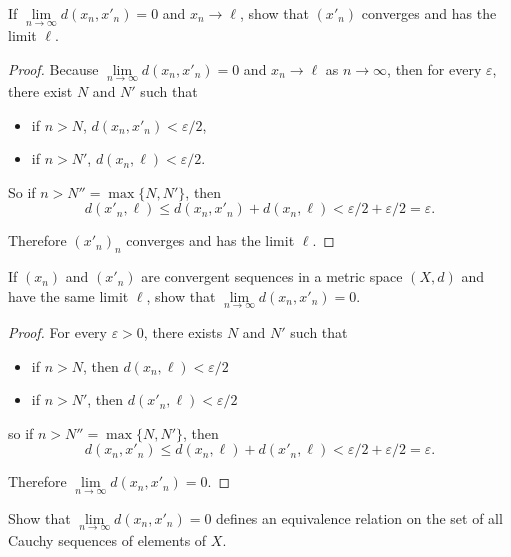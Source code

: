 \begin{exercise}\label{chapter1:section6:exercise9}
    If $\lim\limits_{n\to\infty} d(x_{n}, x'_{n}) = 0$ and $x_{n}\to \ell$, show that ${(x'_{n})}$ converges and has the limit $\ell$.
\end{exercise}

\begin{proof}
    Because $\lim\limits_{n\to\infty} d(x_{n}, x'_{n}) = 0$ and $x_{n}\to \ell$ as $n\to \infty$, then for every $\varepsilon$, there exist $N$ and $N'$ such that
    \begin{itemize}
        \item if $n > N$, $d(x_{n}, x'_{n}) < \varepsilon/2$,
        \item if $n > N'$, $d(x_{n}, \ell) < \varepsilon/2$.
    \end{itemize}

    So if $n > N'' = \max\{N, N'\}$, then
    \[
        d(x'_{n}, \ell)\leq d(x_{n}, x'_{n}) + d(x_{n}, \ell) < \varepsilon/2 + \varepsilon/2 = \varepsilon.
    \]

    Therefore ${(x'_{n})}_{n}$ converges and has the limit $\ell$.
\end{proof}

\begin{exercise}\label{chapter1:section6:exercise10}
    If ${(x_{n})}$ and ${(x'_{n})}$ are convergent sequences in a metric space $(X, d)$ and have the same limit $\ell$, show that $\lim\limits_{n\to\infty} d(x_{n}, x'_{n}) = 0$.
\end{exercise}

\begin{proof}
    For every $\varepsilon > 0$, there exists $N$ and $N'$ such that
    \begin{itemize}
        \item if $n > N$, then $d(x_{n}, \ell) < \varepsilon/2$
        \item if $n > N'$, then $d(x'_{n}, \ell) < \varepsilon/2$
    \end{itemize}

    so if $n > N'' = \max\{ N, N' \}$, then
    \[
        d(x_{n}, x'_{n})\leq d(x_{n}, \ell) + d(x'_{n},\ell) < \varepsilon/2 + \varepsilon/2 = \varepsilon.
    \]

    Therefore $\lim\limits_{n\to\infty} d(x_{n}, x'_{n}) = 0$.
\end{proof}

\begin{exercise}\label{chapter1:section6:exercise11}
    Show that $\lim\limits_{n\to\infty} d(x_{n}, x'_{n}) = 0$ defines an equivalence relation on the set of all Cauchy sequences of elements of $X$.
\end{exercise}

